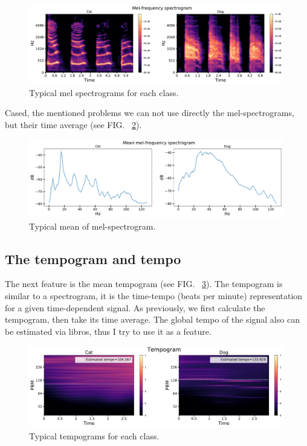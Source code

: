\documentclass[12pt a4paper]{article}
\numberwithin{equation}{section}
\begin{document}
\begin{figure}[H]
\centering
\includegraphics[width=0.99\textwidth]{fig/mel.pdf}
\caption{Typical mel spectrograms for each class.}
\label{fig4}
\end{figure}
Cased, the mentioned problems we can not use directly the mel-spectrograms, but their time average (see FIG. ~\ref{fig5}).

\begin{figure}[H]
\centering
\includegraphics[width=0.99\textwidth]{fig/mel_pro.pdf}
\caption{Typical mean of mel-spectrogram.}
\label{fig5}
\end{figure}

\subsection{The tempogram and tempo}

The next feature is the mean tempogram (see FIG. ~\ref{fig6}).  The tempogram is similar to a spectrogram, it is the time-tempo (beats per minute) representation for a given time-dependent signal. As previously, we first calculate the tempogram, then take its time average. The global tempo of the signal also can be estimated via libros, thus I try to use it as a feature.

\begin{figure}[H]
\centering
\includegraphics[width=0.99\textwidth]{fig/tempogram.pdf}
\caption{Typical tempograms for each class.}
\label{fig6}
\end{figure}
\end{document}
